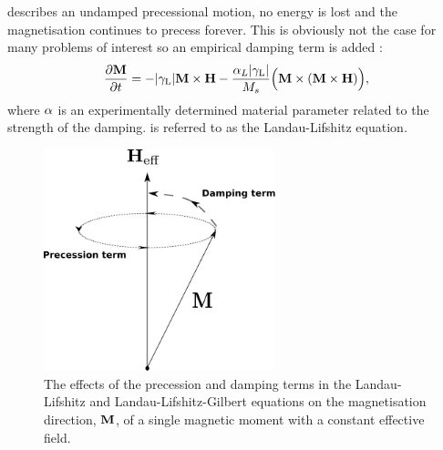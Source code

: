  describes an undamped precessional motion, \ie no energy is lost and the magnetisation continues to precess forever. This is obviously not the case for many problems of interest so an empirical damping term is added \cite{Landau1935}:
\begin{equation}
  \label{eq:LL}
  \frac{\partial \boldsymbol{\mathrm{M}}}{\partial t} = - {\left|{\gamma_{\mathrm{\tiny{L}}}} \right|} \boldsymbol{\mathrm{M}} \times \boldsymbol{\mathrm{H}} - \frac{\alpha_L {\left|{\gamma_{\mathrm{\tiny{L}}}} \right|}}{M_s} \Big( \boldsymbol{\mathrm{M}} \times (\boldsymbol{\mathrm{M}} \times \boldsymbol{\mathrm{H}}) \Big),
\end{equation}
where $\alpha$ is an experimentally determined material parameter related to the strength of the damping.  is referred to as the Landau-Lifshitz equation.

\begin{figure}
  \centering
  \includegraphics[width=0.6\textwidth]{./images/LLG-terms}
  \caption{The effects of the precession and damping terms in the Landau-Lifshitz and Landau-Lifshitz-Gilbert equations on the magnetisation direction, $\boldsymbol{\mathrm{M}}$, of a single magnetic moment with a constant effective field.}
  \label{fig:LLG-terms}
\end{figure}

